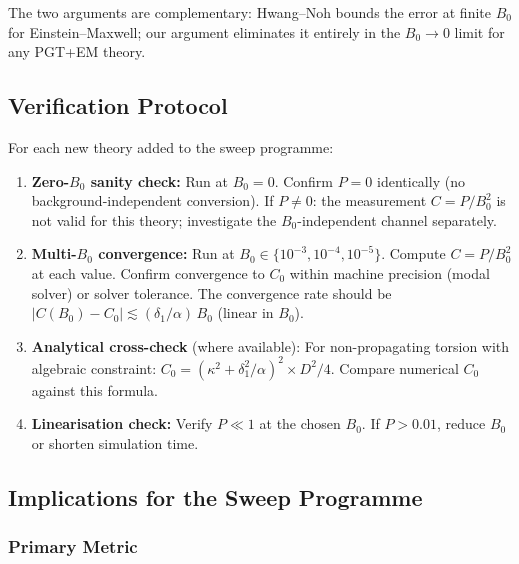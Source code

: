 The two arguments are complementary: Hwang--Noh bounds the error at finite
$B_0$ for Einstein--Maxwell; our argument eliminates it entirely in the
$B_0 \to 0$ limit for any PGT+EM theory.


\subsection{Verification Protocol}
\label{sec:bv-verification}

For each new theory added to the sweep programme:

\begin{enumerate}
  \item \textbf{Zero-$B_0$ sanity check:} Run at $B_0 = 0$.
    Confirm $P = 0$ identically (no background-independent conversion).
    If $P \neq 0$: the measurement $C = P/B_0^2$ is not valid for this
    theory; investigate the $B_0$-independent channel separately.

  \item \textbf{Multi-$B_0$ convergence:} Run at
    $B_0 \in \{10^{-3}, 10^{-4}, 10^{-5}\}$.
    Compute $C = P/B_0^2$ at each value.  Confirm convergence to $C_0$
    within machine precision (modal solver) or solver tolerance.
    The convergence rate should be $|C(B_0) - C_0| \lesssim
    (\delta_1/\alpha)\, B_0$ (linear in $B_0$).

  \item \textbf{Analytical cross-check} (where available):
    For non-propagating torsion with algebraic constraint:
    $C_0 = (\kappa^2 + \delta_1^2/\alpha)^2 \times D^2/4$.
    Compare numerical $C_0$ against this formula.

  \item \textbf{Linearisation check:} Verify $P \ll 1$ at the chosen
    $B_0$.  If $P > 0.01$, reduce $B_0$ or shorten simulation time.
\end{enumerate}


\subsection{Implications for the Sweep Programme}
\label{sec:bv-sweep-implications}

\subsubsection{Primary Metric}

